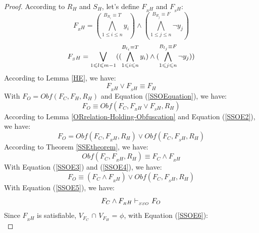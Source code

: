 \documentclass[conference]{IEEEtran}
\begin{document}
\begin{proof}
        According to $R_H$ and $S_H$, let's define $F_{_RH}$ and $F_{_SH}$:
        \begin{equation}\label{SSORH}
        F_{_RH}=
        (\bigwedge_{1\leqslant i\leqslant n}^{B_{R_i}\equiv T}y_i)\wedge 
        (\bigwedge_{1\leqslant j\leqslant n}^{B_{R_j}\equiv F}\neg y_j)
        \end{equation}
        \begin{equation}\label{SSOSH}
         F_{_SH}=\bigvee_{1\leqslant l\leqslant m-1}(
        (\bigwedge_{1\leqslant i\leqslant n}^{B_{l_i}\equiv T}y_i)\wedge
        (\bigwedge_{1\leqslant j\leqslant n}^{B_{l_j}\equiv F}\neg y_j))   \\ 
	  \end{equation}        
According to Lemma \ref{HE}, we have:\\
        \begin{equation}\label{SSOEquation}
        F_{_RH}\vee F_{_SH}\equiv F_H
        \end{equation}        
With $F_O=Obf(F_C,F_H,R_H)$ and Equation (\ref{SSOEquation}), we have:\\  
        \begin{equation}\label{SSOE2}
	F_O \equiv Obf(F_C,F_{_RH}\vee F_{_SH},R_H)
        \end{equation}
According to Lemma \ref{ORrelation-Holding-Obfuscation} and Equation (\ref{SSOE2}), we have:\\
        \begin{equation}\label{SSOE3}
	  F_O=Obf(F_C,F_{_RH},R_H) \vee Obf(F_C,F_{_SH},R_H)
	\end{equation}
According to Theorem \ref{SSEtheorem}, we have:\\
	\begin{equation}\label{SSOE4}
	  Obf(F_C,F_{_RH},R_H)\equiv F_C\wedge F_{_RH}
        \end{equation}
With Equation (\ref{SSOE3}) and (\ref{SSOE4}), we have:\\
        \begin{equation}\label{SSOE5}
	  F_O \equiv (F_C\wedge F_{_RH}) \vee Obf(F_C,F_{_SH},R_H)
	\end{equation}
With Equation (\ref{SSOE5}), we have:\\
	 \begin{equation}\label{SSOE6}
	  F_C \wedge F_{_RH}\vdash_{_{SSO}} F_{O} \\
	\end{equation}
Since $F_{_RH}$ is satisfiable, $V_{F_C}$ $\cap$ $V_{F_H}$ = $\phi$, with Equation (\ref{SSOE6}):\\	

\end{proof}
\end{document}
